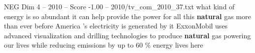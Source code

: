 \begin{textsample}{NEG Dim 4 – 2010 – Score -1.00 – 2010/tv\_com\_2010\_37.txt}  \label{ex:f4_neg_050}
what kind of energy is so abundant it can help provide the power for all this \textbf{natural} gas more than ever before America 's electricity is generated by it ExxonMobil uses advanced visualization and drilling technologies to produce \textbf{natural} gas powering our lives while reducing emissions by up to 60 \% energy lives here

\end{textsample}
